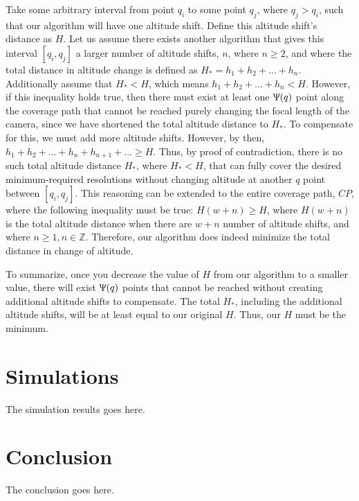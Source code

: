 \documentclass[conference]{IEEEtran}
\theoremstyle{plain}%
\begin{document}
Take some arbitrary interval from point $q_i$ to some point $q_j$, where $q_j > q_i$, such that our algorithm will have one altitude shift. Define this altitude shift's distance as $H$. Let us assume there exists another algorithm that gives this interval $[q_i, q_j]$ a larger number of altitude shifts, $n$, where $n \geq 2$, and where the total distance in altitude change is defined as $H_* = h_1 + h_2 + ... + h_n$. Additionally assume that $H_* < H$, which means $h_1 + h_2 + ... + h_n < H$. However, if this inequality holds true, then there must exist at least one $\Uppsi(q)$ point along the coverage path that cannot be reached purely changing the focal length of the camera, since we have shortened the total altitude distance to $H_*$. To compensate for this, we must add more altitude shifts. However, by then, $h_1 + h_2 + ... + h_n + h_{n+1} + ... \geq H$. Thus, by proof of contradiction, there is no such total altitude distance $H_*$, where $H_* < H$, that can fully cover the desired minimum-required resolutions without changing altitude at another $q$ point between $[q_i, q_j]$. This reasoning can be extended to the entire coverage path, $CP$, where the following inequality must be true: $H(w+n) \geq H$, where $H(w+n)$ is the total altitude distance when there are $w+n$ number of altitude shifts, and where $n \geq 1, n \in \mathds{Z}$. Therefore, our algorithm does indeed minimize the total distance in change of altitude.

To summarize, once you decrease the value of $H$ from our algorithm to a smaller value, there will exist $\Uppsi(q)$ points that cannot be reached without creating additional altitude shifts to compensate. The total $H_*$, including the additional altitude shifts, will be at least equal to our original $H$. Thus, our $H$ must be the minimum.

\section{Simulations}
The simulation results goes here.

\section{Conclusion}
The conclusion goes here.


\end{document}
